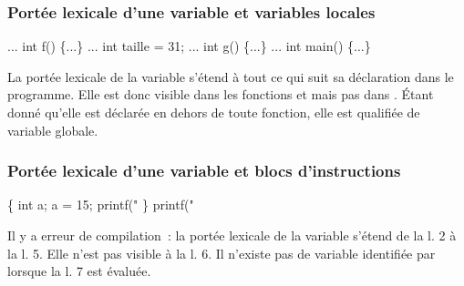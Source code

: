 \begin{frame}[fragile]
    \frametitle{Portée lexicale d'une variable et variables locales}
\begin{multicols}{2}
\begin{semiverbatim}
...
int f() \{...\}
...
int taille = 31;
...
int g() \{...\}
...
int main() \{...\}
\end{semiverbatim}
La portée lexicale de la variable  s'étend à tout ce qui
suit sa déclaration dans le programme. Elle est donc visible dans les
fonctions  et  mais pas dans . Étant donné
qu'elle est déclarée en dehors de toute fonction, elle est qualifiée de
\alert{variable globale}.
\end{multicols}
\bigskip

\end{frame}

\begin{frame}[fragile]
\frametitle{Portée lexicale d'une variable et blocs d'instructions}
\begin{multicols}{2}
\begin{semiverbatim}
\{
    int a;
    a = 15;
    printf("%
\}
printf("%
\end{semiverbatim}
Il y a erreur de compilation~: la portée
lexicale de la variable  s'étend de la l. 2 à la l. 5.
Elle n'est pas visible à la l. 6. Il n'existe
pas de variable identifiée par  lorsque la l. 7 est évaluée.
\end{multicols}
\smallskip

\begin{multicols}{2}
\begin{semiverbatim}\small{}
\end{semiverbatim}
\end{multicols}
\end{frame}

